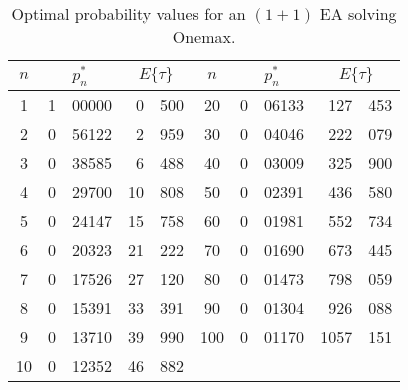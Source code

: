 \documentclass{article}
\newcommand{\Exp}[1]{E\{#1\}}
\begin{document}
\begin{table}[!ht]
\begin{center}
\begin{tabular}{|cr@{.}lr@{.}l||cr@{.}lr@{.}l|}
\hline
$n$ 
& \multicolumn{2}{c}{$p_n^*$} 
& \multicolumn{2}{c||}{$\Exp{\tau}$} 
& $n$ 
& \multicolumn{2}{c}{$p_n^*$} 
& \multicolumn{2}{c|}{$\Exp{\tau}$}  \\
\hline
1 & 1&00000 & 0&500 & 20 & 0&06133 & 127&453 \\
2 & 0&56122 & 2&959 & 30 & 0&04046 & 222&079 \\
3 & 0&38585 & 6&488 & 40 & 0&03009 & 325&900 \\
4 & 0&29700 & 10&808 & 50 & 0&02391 & 436&580 \\
5 & 0&24147 & 15&758 & 60 & 0&01981 & 552&734 \\
6 & 0&20323 & 21&222 & 70 & 0&01690 & 673&445 \\
7 & 0&17526 & 27&120 & 80 & 0&01473 & 798&059 \\
8 & 0&15391 & 33&391 & 90 & 0&01304 & 926&088 \\
9 & 0&13710 & 39&990 & 100 & 0&01170 & 1057&151 \\
10 & 0&12352 & 46&882 &    &  \multicolumn{2}{c}{~} &      \multicolumn{2}{c|}{~}         \\
\hline 
\end{tabular}
\end{center}
\caption{Optimal probability values for an $(1+1)$ EA solving Onemax.}
\label{tab:optimal-p}
\end{table}
\end{document}
